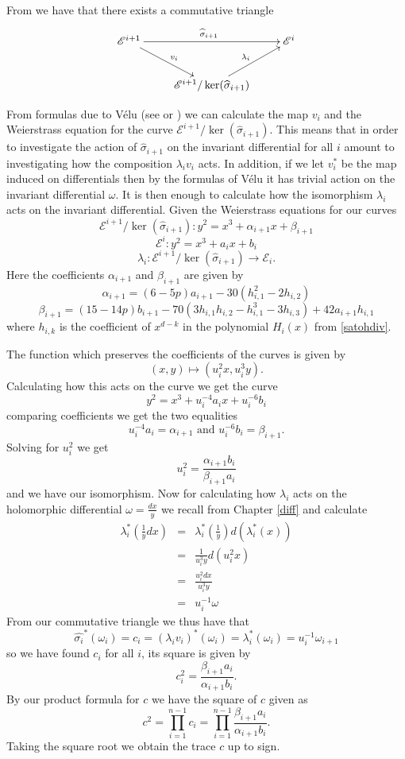 From \cite{AEC} we have that there exists a commutative triangle
$$
\xymatrix{
  \mathscr{E}^{i+1} \ar[rr]^{\widehat{\sigma}_{i+1}} \ar[dr]^{v_{i}} && \mathscr{E}^i \\
  & \mathscr{E}^{i+1}/\ker(\widehat{\sigma}_{i+1}) \ar[ur]^{\lambda_i} & 
}
$$

From formulas due to V\'{e}lu (see \cite{Velu} or \cite{Sato}) we can calculate the map
$v_i$ and the Weierstrass equation for the curve $\mathscr{E}^{i+1}/\ker(\widehat{\sigma}_{i+1})$.
This means that in order to investigate the action of
$\widehat{\sigma}_{i+1}$ on the invariant differential for all $i$ amount to investigating
how the composition $\lambda_i v_i$ acts. In addition, if we let $v_i^*$ be the map induced 
on differentials then by the formulas of V\'{e}lu it has trivial action on the invariant differential $\omega$.
It is then enough to calculate how the isomorphism $\lambda_i$ acts on the invariant differential. 
Given the Weierstrass equations for our curves
$$ \mathscr{E}^{i+1}/\ker(\widehat{\sigma}_{i+1}): y^2 = x^3 + \alpha_{i+1}x + \beta_{i+1}$$
$$ \mathscr{E}^i: y^2 = x^3 + a_i x + b_i $$
$$ \lambda_i: \mathscr{E}^{i+1}/\ker(\widehat{\sigma}_{i+1}) \rightarrow \mathscr{E}_i. $$
Here the coefficients $\alpha_{i+1}$ and $\beta_{i+1}$ are given by
$$\alpha_{i+1} = (6-5p)a_{i+1}-30(h_{i,1}^2-2h_{i,2})$$
$$\beta_{i+1}  = (15-14p)b_{i+1}-70(3h_{i,1}h_{i,2}-h_{i,1}^3-3h_{i,3})+42a_{i+1}h_{i,1}$$
where $h_{i,k}$ is the coefficient of $x^{d-k}$ in the polynomial $H_i(x)$ from \ref{satohdiv}.

The function which preserves the coefficients of the curves is given by
$$(x,y) \mapsto (u_i^2 x, u_i^3 y). $$
Calculating how this acts on the curve we get the curve
$$ y^2 = x^3 + u_i^{-4} a_i x + u_i^{-6} b_i$$
comparing coefficients we get the two equalities
$$ u_i^{-4} a_i = \alpha_{i+1} \text{ and } u_i^{-6} b_i = \beta_{i+1}. $$
Solving for $u_i^2$ we get
$$ u_i^2 = \frac{\alpha_{i+1} b_i}{\beta_{i+1} a_i} $$
and we have our isomorphism. Now for calculating how $\lambda_i$ acts on the holomorphic
differential $\omega=\frac{dx}{y}$ we recall from Chapter \ref{diff} and calculate
\begin{eqnarray}
 \lambda_i^*(\frac{1}{y} dx) &=& \lambda_i^*(\frac{1}{y}) d(\lambda_i^*(x)) \nonumber \\
			     &=& \frac{1}{u_i^3 y} d(u_i^2 x) \nonumber \\
			     &=& \frac{u_i^2 dx}{u_i^3 y} \nonumber \\
			     &=& u_i^{-1} \omega \nonumber
\end{eqnarray}
From our commutative triangle we thus have that
$$ \widehat{\sigma_i}^*(\omega_i) = c_i = (\lambda_i v_i)^*(\omega_i) = \lambda_i^*(\omega_i) = u_i^{-1}\omega_{i+1}$$
so we have found $c_i$ for all $i$, its square is given by
$$ c_i^2 = \frac{\beta_{i+1} a_i}{\alpha_{i+1} b_i}. $$
By our product formula for $c$ we have the square of $c$ given as
$$ c^2 = \prod_{i=1}^{n-1} c_i = \prod_{i=1}^{n-1} \frac{\beta_{i+1} a_i}{\alpha_{i+1} b_i}. $$
Taking the square root we obtain the trace $c$ up to sign.

